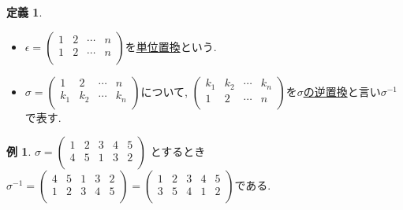 \documentclass[dvipdfmx,a4paper,11pt]{article}
\theoremstyle{definition}
\newtheorem{dfn}[thm]{定義}
\newtheorem{exa}[thm]{例}
\begin{document}
\begin{tcolorbox}[
    colback = white,
    colframe = green!35!black,
    fonttitle = \bfseries,
    breakable = true]
    \begin{dfn}
\text{}
\begin{itemize}
\item $
\epsilon =
  \begin{pmatrix}
 1& 2  &\cdots &n\\
 1& 2  &\cdots &n\\
 \end{pmatrix} $を\underline{単位置換}という.
 \item  
 $ \sigma =
  \begin{pmatrix}
 1& 2  &\cdots &n\\
 k_1& k_2  &\cdots &k_n\\
 \end{pmatrix} 
$について, 
$
  \begin{pmatrix}
 k_1& k_2  &\cdots &k_n\\
 1& 2  &\cdots &n\\
 \end{pmatrix} 
$を\underline{$\sigma$の逆置換}と言い$\sigma^{-1}$で表す.
\end{itemize}
  \end{dfn}
 \end{tcolorbox}

\begin{exa} 
$\sigma = 
\begin{pmatrix}
 1& 2  &3 & 4 & 5\\
 4& 5  &1  &3 &2\\
 \end{pmatrix} 
$
とするとき
$
\sigma^{-1}
=
\begin{pmatrix}
 4& 5  &1  &3 &2\\
 1& 2  &3 & 4 & 5\\
 \end{pmatrix} 
 =
 \begin{pmatrix}
 1& 2  &3 & 4 & 5\\
 3& 5  &4  &1 &2\\
 \end{pmatrix} 
 \text{である.}
$
\end{exa}
\end{document}
